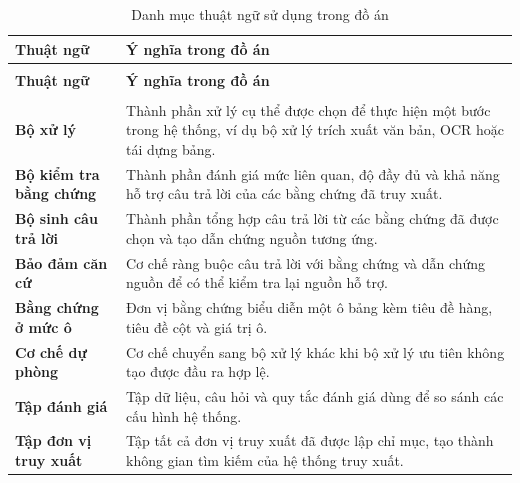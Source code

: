 \documentclass[../DoAn.tex]{subfiles}
\begin{document}
\begin{longtable}{
    @{}
    >{\raggedright\arraybackslash}p{}
    >{\raggedright\arraybackslash}p{}
    @{}
}
\caption{Danh mục thuật ngữ sử dụng trong đồ án}
\label{tab:list-of-terms}\\
\hline
\textbf{Thuật ngữ} & \textbf{Ý nghĩa trong đồ án} \\
\hline
\endfirsthead

\multicolumn{2}{c}{\textit{Bảng~\thetable{} (tiếp theo)}}\\
\hline
\textbf{Thuật ngữ} & \textbf{Ý nghĩa trong đồ án} \\
\hline
\endhead

\hline
\multicolumn{2}{r}{\textit{Còn tiếp ở trang sau}}\\
\endfoot

\hline
\endlastfoot

\textbf{Bộ xử lý}
& Thành phần xử lý cụ thể được chọn để thực hiện một bước trong hệ thống, ví dụ bộ xử lý trích xuất văn bản, OCR hoặc tái dựng bảng. \\

\textbf{Bộ kiểm tra bằng chứng}
& Thành phần đánh giá mức liên quan, độ đầy đủ và khả năng hỗ trợ câu trả lời của các bằng chứng đã truy xuất. \\

\textbf{Bộ sinh câu trả lời}
& Thành phần tổng hợp câu trả lời từ các bằng chứng đã được chọn và tạo dẫn chứng nguồn tương ứng. \\

\textbf{Bảo đảm căn cứ}
& Cơ chế ràng buộc câu trả lời với bằng chứng và dẫn chứng nguồn để có thể kiểm tra lại nguồn hỗ trợ. \\

\textbf{Bằng chứng ở mức ô}
& Đơn vị bằng chứng biểu diễn một ô bảng kèm tiêu đề hàng, tiêu đề cột và giá trị ô. \\

\textbf{Cơ chế dự phòng}
& Cơ chế chuyển sang bộ xử lý khác khi bộ xử lý ưu tiên không tạo được đầu ra hợp lệ. \\

\textbf{Tập đánh giá}
& Tập dữ liệu, câu hỏi và quy tắc đánh giá dùng để so sánh các cấu hình hệ thống. \\

\textbf{Tập đơn vị truy xuất}
& Tập tất cả đơn vị truy xuất đã được lập chỉ mục, tạo thành không gian tìm kiếm của hệ thống truy xuất. \\


\end{longtable}
\end{document}
